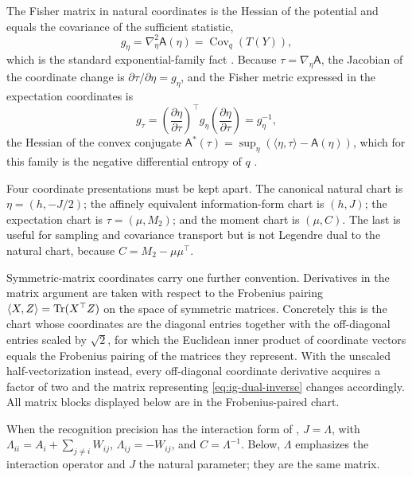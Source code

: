 The Fisher matrix in natural coordinates is the Hessian of the potential and equals the covariance of the sufficient statistic,
\begin{equation}
g_\eta=\nabla^2_\eta\mathsf A(\eta)=\operatorname{Cov}_q\left(T(Y)\right),
\label{eq:ig-fisher-hessian}
\end{equation}
which is the standard exponential-family fact \citep{Brown1986,AmariNagaoka2000,Amari2016}. Because $\tau=\nabla_\eta\mathsf A$, the Jacobian of the coordinate change is $\partial\tau/\partial\eta=g_\eta$, and the Fisher metric expressed in the expectation coordinates is
\begin{equation}
g_\tau=\left(\frac{\partial\eta}{\partial\tau}\right)^{\top} g_\eta\left(\frac{\partial\eta}{\partial\tau}\right)=g_\eta^{-1},
\label{eq:ig-dual-inverse}
\end{equation}
the Hessian of the convex conjugate $\mathsf A^{*}(\tau)=\sup_\eta\left(\langle\eta,\tau\rangle-\mathsf A(\eta)\right)$, which for this family is the negative differential entropy of $q$ \citep{AmariNagaoka2000,nielsen2020elementary}. 

Four coordinate presentations must be kept apart. The canonical natural
chart is \(\eta=(h,-J/2)\); the affinely equivalent information-form chart
is \((h,J)\); the expectation chart is
\(\tau=(\mu,M_2)\); and the moment chart is \((\mu,C)\). The last is useful
for sampling and covariance transport but is not Legendre dual to the
natural chart, because \(C=M_2-\mu\mu^\top\). 

Symmetric-matrix coordinates carry one further convention. Derivatives in the matrix argument are taken with respect to the Frobenius pairing $\langle X,Z\rangle=\operatorname{Tr}(X^\top Z)$ on the space of symmetric matrices. Concretely this is the chart whose coordinates are the diagonal entries together with the off-diagonal entries scaled by $\sqrt2$, for which the Euclidean inner product of coordinate vectors equals the Frobenius pairing of the matrices they represent. With the unscaled half-vectorization instead, every off-diagonal coordinate derivative acquires a factor of two and the matrix representing \eqref{eq:ig-dual-inverse} changes accordingly. All matrix blocks displayed below are in the Frobenius-paired chart. 

When the recognition precision has the interaction form of
, \(J=\Lambda\), with
\(\Lambda_{ii}=A_i+\sum_{j\neq i}W_{ij}\),
\(\Lambda_{ij}=-W_{ij}\), and \(C=\Lambda^{-1}\). Below, \(\Lambda\)
emphasizes the interaction operator and \(J\) the natural parameter; they
are the same matrix.

